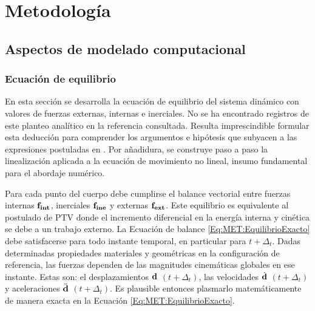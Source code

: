 \chapter{Metodología}
\linenumbers
\section{Aspectos de modelado computacional}
\subsection{Ecuación de equilibrio}\label{Sec:MET:EqEquilibrio}

En esta sección se desarrolla la ecuación de equilibrio del sistema dinámico con valores de fuerzas externas, internas e inerciales. No se ha encontrado registros de este planteo analítico en la referencia consultada. Resulta imprescindible formular esta deducción para comprender los argumentos e hipótesis que subyacen a las expresiones postuladas en \citep{Le2014}. Por añadidura, se construye paso a paso la linealización aplicada a la ecuación de movimiento no lineal, insumo fundamental para el abordaje numérico. 

Para cada punto del cuerpo debe cumplirse el balance vectorial entre fuerzas internas $\bf{f}_{int}$, inerciales $\bf{f}_{ine}$ y externas $\bf{f}_{ext}$. Este equilibrio es equivalente al postulado de PTV donde el incremento diferencial en la energía interna y cinética se debe a un trabajo externo. La Ecuación de balance \eqref{Eq:MET:EquilibrioExacto} debe satisfacerse para todo instante temporal, en particular para $t+\Delta_t$. Dadas determinadas propiedades materiales y geométricas en la configuración de referencia, las fuerzas dependen de las magnitudes cinemáticas globales en ese instante. Estas son: el desplazamientos $\bf{d}$ $(t+\Delta_t)$, las velocidades $\dot{\bf{d}}$ $(t+\Delta_t)$ y aceleraciones $\ddot{\bf{d}}$ $(t+\Delta_t)$. Es plausible entonces plasmarlo matemáticamente de manera exacta en la Ecuación \eqref{Eq:MET:EquilibrioExacto}.

